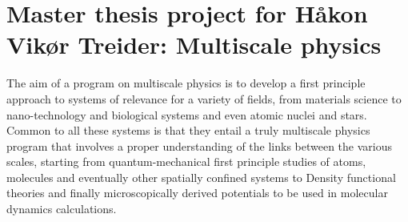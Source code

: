 \documentclass[10pt]{article}
\begin{document}
\section*{Master thesis project for H\aa kon Vik\o r Treider: Multiscale physics}

The aim of a program on multiscale physics is to develop a first
principle approach to systems of relevance for a variety of fields,
from materials science to nano-technology and biological systems and
even atomic nuclei and stars.  Common to all these systems is that
they entail a truly multiscale physics program that involves a proper
understanding of the links between the various scales, starting from
quantum-mechanical first principle studies of atoms, molecules and
eventually other spatially confined systems to Density functional
theories and finally microscopically derived potentials to be used in
molecular dynamics calculations.
\end{document}
